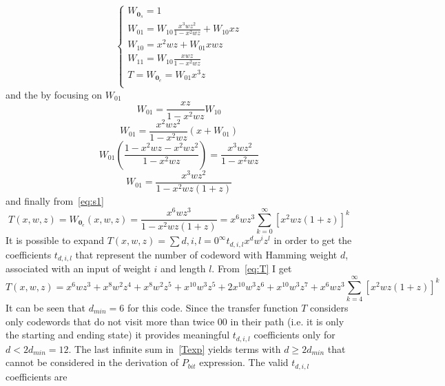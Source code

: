 \documentclass[10pt]{article}
\begin{document}
\begin{equation}
\begin{cases}
	W_{\mathbf{0}_s} = 1 \\ %
	W_{01} = W_{10}\frac{x^3wz^2}{1-x^2wz} + W_{10}xz \\
	W_{10} = x^2wz + W_{01}xwz \\
	W_{11} = W_{10}\frac{xwz}{1-x^2wz} \\
	T = W_{\mathbf{0}_e} = W_{01}x^3z\\
\end{cases}
\end{equation}
and the by focusing on $W_{01}$
\begin{equation*}
	W_{01} =  \frac{xz}{1-x^2wz}W_{10}
\end{equation*}
\begin{equation*}
	W_{01}  =  \frac{x^2wz^2}{1-x^2wz}(x + W_{01})
\end{equation*}
\begin{equation*}
	W_{01}\left(\frac{1 - x^2wz - x^2wz^2}{1-x^2wz} \right) = \frac{x^3wz^2}{1-x^2wz}
\end{equation*}
\begin{equation*}
	W_{01} = \frac{x^3wz^2}{1-x^2wz(1+z)}
\end{equation*}
and finally from~\eqref{eq:s1}
\begin{equation}\label{eq:T}
	T(x, w, z) = W_{\mathbf{0}_e}(x, w, z) = \frac{x^6wz^3}{1-x^2wz(1+z)} = x^6wz^3\sum_{k=0}^{\infty} [x^2wz(1+z)]^k
\end{equation}
It is possible to expand $T(x,w,z) = \sum{d, i, l = 0}^{\infty} t_{d, i, l}x^dw^iz^l$ in order to get the coefficients $t_{d,i,l}$ that represent the number of codeword with Hamming weight $d$, associated with an input of weight $i$ and length $l$. From~\eqref{eq:T} I get
\begin{equation}\label{Texp}
	T(x, w, z) = x^6wz^3 + x^8w^2z^4 + x^8w^2z^5 + x^{10}w^3z^5 + 2x^{10}w^3z^6 + x^{10}w^3z^7 + x^6wz^3\sum_{k=4}^{\infty}[x^2wz(1+z)]^k
\end{equation}
It can be seen that $d_{min}=6$ for this code. Since the transfer function $T$ considers only codewords that do not visit more than twice $00$ in their path (i.e. it is only the starting and ending state) it provides meaningful $t_{d, i, l}$ coefficients only for $d < 2d_{min} = 12$. The last infinite sum in~\eqref{Texp} yields terms with $d \ge 2d_{min}$ that cannot be considered in the derivation of $P_{bit}$ expression. The valid $t_{d, i, l}$ coefficients are
\end{document}
